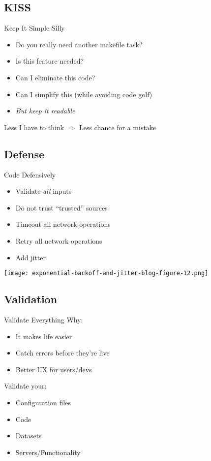 \documentclass[12pt]{ufrslides}
\begin{document}
\subsection{KISS}
\begin{frame}{Keep It Simple Silly}
	\begin{itemize}
		\item Do you really need another makefile task?
		\item Is this feature needed?
		\item Can I eliminate this code?
		\item Can I simplify this (while avoiding code golf)
		\item \emph{But keep it readable}
	\end{itemize}
	\vfill
	Less I have to think $\Rightarrow$ Less chance for a mistake
\end{frame}

\subsection{Defense}
\begin{frame}{Code Defensively}
	\begin{itemize}
		\item Validate \emph{all} inputs
		\item Do not trust ``trusted'' sources
		\item Timeout all network operations
		\item Retry all network operations
		\item Add jitter\cite{aws:jitter}
	\end{itemize}
	\texttt{[image: exponential-backoff-and-jitter-blog-figure-12.png]}
\end{frame}

\subsection{Validation}
\begin{frame}{Validate Everything}
	Why:
	\begin{itemize}
		\item It makes life easier
		\item Catch errors before they're live
		\item Better UX for users/devs
	\end{itemize}
	\vfill
	Validate your:
	\begin{itemize}
		\item Configuration files
		\item Code
		\item Datasets
		\item Servers/Functionality
	\end{itemize}
\end{frame}
\end{document}

